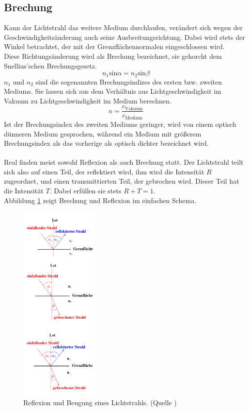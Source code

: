 \subsection{Brechung}
Kann der Lichtstrahl das weitere Medium durchlaufen, verändert sich wegen
der Geschwindigkeitsänderung auch seine Ausbreitungsrichtung. Dabei wird stets
der Winkel betrachtet, der mit der Grenzflächennormalen eingeschlossen wird.\\
Diese Richtungsänderung wird als Brechung bezeichnet, sie gehorcht dem Snellius'schen
Brechungsgesetz.
\begin{equation}
    n_1 \text{sin} \alpha = n_2 \text{sin} \beta
    \label{eqn:snellius}
\end{equation}
$n_1$ und $n_2$ sind die sogenannten Brechungsindizes des ersten bzw. zweiten
Mediums. Sie lassen sich aus dem Verhältnis aus Lichtgeschwindigkeit im Vakuum 
zu Lichtgeschwindigkeit im Medium berechnen.
\begin{equation}
    n = \frac{c_\text{Vakuum}}{c_\text{Medium}}
    \label{eqn:brech}
\end{equation}
Ist der Brechungsindex des zweiten Mediums geringer, wird von 
einem optisch dünneren Medium gesprochen, während ein Medium mit größerem
Brechungsindex als das vorherige als optisch dichter bezeichnet wird.\\
\\
Real finden meist sowohl Reflexion als auch Brechung statt. Der Lichtstrahl teilt
sich also auf einen Teil, der reflektiert wird, ihm wird die Intensität $R$ zugeordnet,
und einen transmittierten Teil, der gebrochen wird. Dieser Teil hat die
Intensität $T$. Dabei erfüllen sie stets $R + T = 1$.\\
Abbildung \ref{fig:schemata} zeigt Brechung und Reflexion im einfachen Schema.

\begin{figure}
    \centering
    \includegraphics[width=0.35\textwidth]{dreidinger.png}
    \caption{Reflexion und Beugung eines Lichtstrahls. (Quelle \cite{versuch})}
    \label{fig:schemata}
\end{figure}

